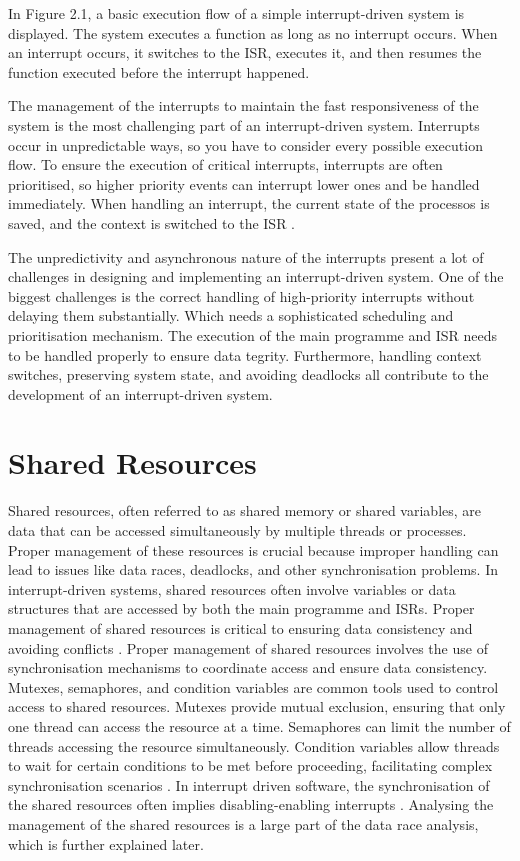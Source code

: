 \documentclass[
fancyheadings, %
%
%
]{stsreprt}
\begin{document}
{		In Figure 2.1, a basic execution flow of a simple interrupt-driven system is displayed. The system executes a function as long as no interrupt occurs. When an interrupt occurs, it switches to the ISR, executes it, and then resumes the function executed before the interrupt happened.
		
		The management of the interrupts to maintain the fast responsiveness of the system is the most challenging part of an interrupt-driven system. Interrupts occur in unpredictable ways, so you have to consider every possible execution flow. To ensure the execution of critical interrupts, interrupts are often prioritised, so higher priority events can interrupt lower ones and be handled immediately. When handling an interrupt, the current state of the processos is saved, and the context is switched to the ISR \cite{wang2020}.
		
		The unpredictivity and asynchronous nature of the interrupts present a lot of challenges in designing and implementing an interrupt-driven system. One of the biggest challenges is the correct handling of high-priority interrupts without delaying them substantially. Which needs a sophisticated scheduling and prioritisation mechanism. The execution of the main programme and ISR needs to be handled properly to ensure data tegrity. Furthermore, handling context switches, preserving system state, and avoiding deadlocks all contribute to the development of an interrupt-driven system.
		
		\section{Shared Resources}
		Shared resources, often referred to as shared memory or shared variables, are data that can be accessed simultaneously by multiple threads or processes. Proper management of these resources is crucial because improper handling can lead to issues like data races, deadlocks, and other synchronisation problems. In interrupt-driven systems, shared resources often involve variables or data structures that are accessed by both the main programme and ISRs. Proper management of shared resources is critical to ensuring data consistency and avoiding conflicts \cite{herlihy2008}.
		Proper management of shared resources involves the use of synchronisation mechanisms to coordinate access and ensure data consistency. Mutexes, semaphores, and condition variables are common tools used to control access to shared resources. Mutexes provide mutual exclusion, ensuring that only one thread can access the resource at a time. Semaphores can limit the number of threads accessing the resource simultaneously. Condition variables allow threads to wait for certain conditions to be met before proceeding, facilitating complex synchronisation scenarios \cite{herlihy2008}. In interrupt driven software, the synchronisation of the shared resources often implies disabling-enabling interrupts \cite{chopra2019}. Analysing the management of the shared resources is a large part of the data race analysis, which is further explained later.
}
\end{document}
